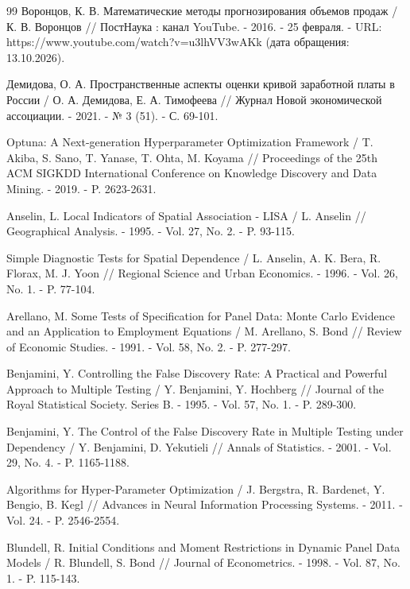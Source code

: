 \documentclass[12pt, a4paper]{article}
\begin{document}
\begin{thebibliography}{99}
    Воронцов, К. В. Математические методы прогнозирования объемов продаж / К. В. Воронцов // ПостНаука : канал YouTube. - 2016. - 25 февраля. - URL: https://www.youtube.com/watch?v=u3lhVV3wAKk (дата обращения: 13.10.2026).

    Демидова, О. А. Пространственные аспекты оценки кривой заработной платы в России / О. А. Демидова, Е. А. Тимофеева // Журнал Новой экономической ассоциации. - 2021. - № 3 (51). - С. 69-101.

    Optuna: A Next-generation Hyperparameter Optimization Framework / T. Akiba, S. Sano, T. Yanase, T. Ohta, M. Koyama // Proceedings of the 25th ACM SIGKDD International Conference on Knowledge Discovery and Data Mining. - 2019. - P. 2623-2631.

    Anselin, L. Local Indicators of Spatial Association - LISA / L. Anselin // Geographical Analysis. - 1995. - Vol. 27, No. 2. - P. 93-115.

    Simple Diagnostic Tests for Spatial Dependence / L. Anselin, A. K. Bera, R. Florax, M. J. Yoon // Regional Science and Urban Economics. - 1996. - Vol. 26, No. 1. - P. 77-104.

    Arellano, M. Some Tests of Specification for Panel Data: Monte Carlo Evidence and an Application to Employment Equations / M. Arellano, S. Bond // Review of Economic Studies. - 1991. - Vol. 58, No. 2. - P. 277-297.

    Benjamini, Y. Controlling the False Discovery Rate: A Practical and Powerful Approach to Multiple Testing / Y. Benjamini, Y. Hochberg // Journal of the Royal Statistical Society. Series B. - 1995. - Vol. 57, No. 1. - P. 289-300.

    Benjamini, Y. The Control of the False Discovery Rate in Multiple Testing under Dependency / Y. Benjamini, D. Yekutieli // Annals of Statistics. - 2001. - Vol. 29, No. 4. - P. 1165-1188.

    Algorithms for Hyper-Parameter Optimization / J. Bergstra, R. Bardenet, Y. Bengio, B. Kegl // Advances in Neural Information Processing Systems. - 2011. - Vol. 24. - P. 2546-2554.

    Blundell, R. Initial Conditions and Moment Restrictions in Dynamic Panel Data Models / R. Blundell, S. Bond // Journal of Econometrics. - 1998. - Vol. 87, No. 1. - P. 115-143.


\end{thebibliography}
\end{document}
